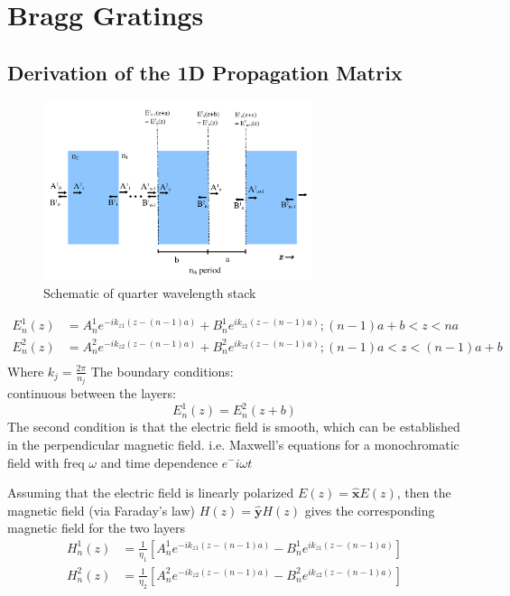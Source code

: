 \chapter[PDF Plots From Matlab]{Bragg Gratings}
\label{AppendixA}
\section{Derivation of the 1D Propagation Matrix }
\begin{figure}[h!]
	\centering
	\includegraphics[width=0.7\textwidth]{./Figures/HCPCF/DBR.png}
	\caption{Schematic of quarter wavelength stack}
	\label{1dstack}
\end{figure}

\begin{equation}
	\begin{aligned}
		E^1_n(z) &= A^1_n e^{-ik_{z1}(z-(n-1)a)} + B^1_n e^{ik_{z1}(z-(n-1)a)};  (n-1)a+b<z<na\\
		E^2_n(z) &= A^2_n e^{-ik_{z2}(z-(n-1)a)} + B^2_n e^{ik_{z2}(z-(n-1)a)};  (n-1)a<z<(n-1)a+b\\
	\end{aligned}
\end{equation}
Where $k _j= \frac{2\pi}{n_j}$
The boundary conditions:\\
continuous between the layers:
\begin{equation}
	E^1_n(z) = E^2_n(z+b)
\end{equation}
The second condition is that the electric field is smooth, which can be established in the perpendicular magnetic field. 
i.e. Maxwell's equations for a monochromatic field with freq $\omega$ and time dependence $e^-i\omega t$

Assuming that the electric field is linearly polarized $E(z) = \boldsymbol{\hat{x}}E(z)$, then the magnetic field (via Faraday's law) $H(z) = \boldsymbol{\hat{y}}H(z)$ gives the corresponding magnetic field for the two layers 
\begin{equation}
	\begin{aligned}
		H^1_n(z) &=\frac{1}{\eta_1}[A^1_n e^{-ik_{z1}(z-(n-1)a)} - B^1_n e^{ik_{z1}(z-(n-1)a)}]\\
		H^2_n(z) &= \frac{1}{\eta_2}[A^2_n e^{-ik_{z2}(z-(n-1)a)} - B^2_n e^{ik_{z2}(z-(n-1)a)}]
	\end{aligned}
\end{equation}

